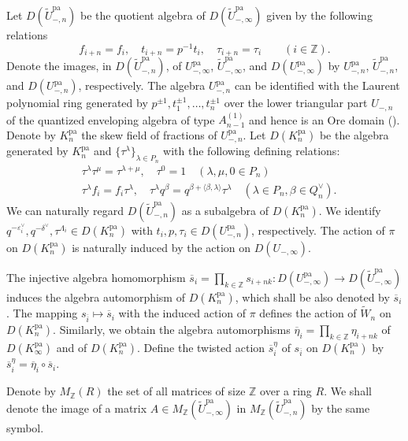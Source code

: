 \documentclass[12pt,twoside]{article}
\newcommand\tU{{\widetilde U}}
\newcommand\tW{{\widetilde W}}
\newcommand\bars{{\overline s}}
\newcommand\bareta{{\overline \eta}}
\newcommand\barhs{\bars^\eta}
\newcommand\eps{\varepsilon}
\newcommand\epsv{\eps^\vee}
\newcommand\deltav{\delta^\vee}
\newcommand\Qv{Q^\vee}
\newcommand\bra{\langle}
\newcommand\ket{\rangle}
\newcommand\pa{{\mathrm{pa}}}
\newcommand\Z{{\mathbb Z}} %
\theoremstyle{plain} %
\theoremstyle{definition} %
\theoremstyle{definition} %
\numberwithin{theorem}{section}
\numberwithin{equation}{section}
\numberwithin{figure}{section}
\numberwithin{table}{section}
\begin{document}
Let $D(\tU_{-,n}^\pa)$ be the quotient algebra of $D(\tU_{-,\infty}^\pa)$
given by the following relations
\begin{equation}
 f_{i+n} = f_i, \quad t_{i+n} = p^{-1}t_i, \quad \tau_{i+n}=\tau_i
 \qquad (i\in\Z).
 \label{eq:n-reduction}
\end{equation}
Denote the images, in $D(\tU_{-,n}^\pa)$, of 
$U_{-,\infty}^\pa$, $\tU_{-,\infty}^\pa$, and $D(U_{-,\infty}^\pa)$ 
by $U_{-,n}^\pa$, $\tU_{-,n}^\pa$, and $D(U_{-,n}^\pa)$,
respectively.
The algebra $U_{-,n}^\pa$ can be identified with 
the Laurent polynomial ring 
generated by $p^{\pm1},t_1^{\pm1},\ldots,t_n^{\pm1}$
over the lower triangular part $U_{-,n}$ of 
the quantized enveloping algebra of type $A^{(1)}_{n-1}$
and hence is an Ore domain (\cite{Kuroki2008}).
Denote by $K_n^\pa$ the skew field of fractions of $U_{-,n}^\pa$.
Let $D(K_n^\pa)$ be the algebra generated by $K_n^\pa$
and $\{\tau^\lambda\}_{\lambda\in P_n}$ 
with the following defining relations:
\begin{align*}
 &
 \tau^\lambda \tau^\mu = \tau^{\lambda+\mu}, \quad
 \tau^0 = 1
 \quad (\lambda,\mu,0\in P_n)
 \\ &
 \tau^\lambda f_i = f_i \tau^\lambda, \quad
 \tau^\lambda q^\beta = q^{\beta+\bra\beta,\lambda\ket}\tau^\lambda
 \quad (\lambda\in P_n, \beta\in\Qv_n).
\end{align*}
We can naturally regard $D(\tU_{-,n}^\pa)$
as a subalgebra of $D(K_n^\pa)$.
We identify $q^{-\epsv_i},q^{-\deltav},\tau^{\Lambda_i}\in D(K_n^\pa)$
with $t_i,p,\tau_i\in D(U_{-,n}^\pa)$, respectively.
The action of $\pi$ on $D(K_n^\pa)$ is naturally induced
by the action on $D(U_{-,\infty})$.

The injective algebra homomorphism 
$\bars_i=\prod_{k\in\Z}s_{i+nk}:D(U_{-,\infty}^\pa)\to D(\tU_{-,\infty}^\pa)$
induces the algebra automorphism of $D(K_n^\pa)$, 
which shall be also denoted by $\bars_i$.
The mapping $s_{\overline{i}}\mapsto\bars_i$ with the induced action of $\pi$
defines the action of $\tW_n$ on $D(K_n^\pa)$.
Similarly, we obtain the algebra automorphisms
$\bareta_i=\prod_{k\in\Z}\eta_{i+nk}$ of 
$D(K_\infty^\pa)$ and of $D(K_n^\pa)$.
Define the twisted action $\barhs_i$ of $s_{\overline{i}}$ on $D(K_n^\pa)$ 
by $\barhs_i = \bareta_i\circ\bars_i$.

Denote by $M_\Z(R)$ the set of all matrices of size $\Z$ over a ring $R$.
We shall denote the image of a matrix $A\in M_\Z(\tU_{-,\infty}^\pa)$
in $M_\Z(\tU_{-,n}^\pa)$ by the same symbol.
\end{document}
